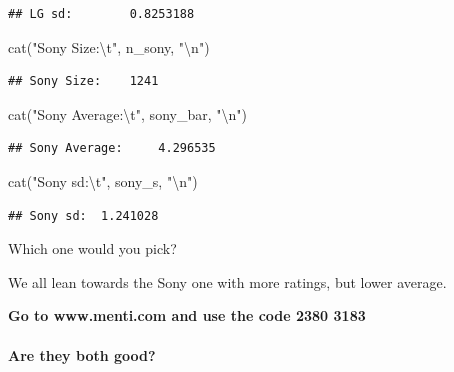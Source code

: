 \documentclass[
]{article}
\newenvironment{Shaded}{\begin{snugshade}}{\end{snugshade}}
\newcommand{\FunctionTok}[1]{\textcolor[rgb]{0.94,0.94,0.56}{#1}}
\newcommand{\NormalTok}[1]{\textcolor[rgb]{0.80,0.80,0.80}{#1}}
\newcommand{\SpecialCharTok}[1]{\textcolor[rgb]{0.86,0.64,0.64}{#1}}
\newcommand{\StringTok}[1]{\textcolor[rgb]{0.80,0.58,0.58}{#1}}
\begin{document}
\begin{verbatim}
## LG sd:        0.8253188
\end{verbatim}

\begin{Shaded}
\begin{Highlighting}[]
\FunctionTok{cat}\NormalTok{(}\StringTok{"Sony Size:}\SpecialCharTok{\textbackslash{}t}\StringTok{"}\NormalTok{, n\_sony, }\StringTok{"}\SpecialCharTok{\textbackslash{}n}\StringTok{"}\NormalTok{)}
\end{Highlighting}
\end{Shaded}

\begin{verbatim}
## Sony Size:    1241
\end{verbatim}

\begin{Shaded}
\begin{Highlighting}[]
\FunctionTok{cat}\NormalTok{(}\StringTok{"Sony Average:}\SpecialCharTok{\textbackslash{}t}\StringTok{"}\NormalTok{, sony\_bar, }\StringTok{"}\SpecialCharTok{\textbackslash{}n}\StringTok{"}\NormalTok{)}
\end{Highlighting}
\end{Shaded}

\begin{verbatim}
## Sony Average:     4.296535
\end{verbatim}

\begin{Shaded}
\begin{Highlighting}[]
\FunctionTok{cat}\NormalTok{(}\StringTok{"Sony sd:}\SpecialCharTok{\textbackslash{}t}\StringTok{"}\NormalTok{, sony\_s, }\StringTok{"}\SpecialCharTok{\textbackslash{}n}\StringTok{"}\NormalTok{)}
\end{Highlighting}
\end{Shaded}

\begin{verbatim}
## Sony sd:  1.241028
\end{verbatim}

Which one would you pick?

We all lean towards the Sony one with more ratings, but lower average.

\textbf{Go to www.menti.com and use the code 2380 3183}

\hypertarget{are-they-both-good}{%
\paragraph{Are they both good?}\label{are-they-both-good}}
\end{document}
